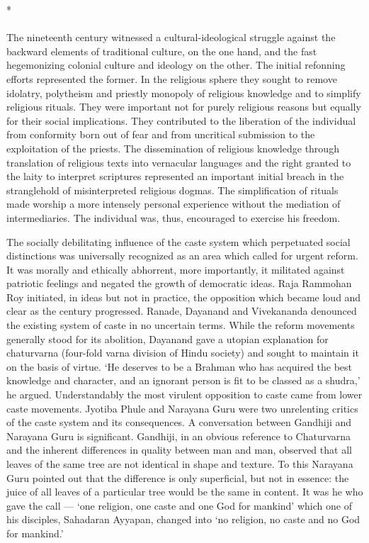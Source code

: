 \begin{center}*\end{center}

\paragraph*{}

The nineteenth century witnessed a cultural-ideological struggle against the backward elements of traditional culture, on the one hand, and the fast hegemonizing colonial culture and ideology on the other. The initial refonning efforts represented the former. In the religious sphere they sought to remove idolatry, polytheism and priestly monopoly of religious knowledge and to simplify religious rituals. They were important not for purely religious reasons but equally for their social implications. They contributed to the liberation of the individual from conformity born out of fear and from uncritical submission to the exploitation of the priests. The dissemination of religious knowledge through translation of religious texts into vernacular languages and the right granted to the laity to interpret scriptures represented an important initial breach in the stranglehold of misinterpreted religious dogmas. The simplification of rituals made worship a more intensely personal experience without the mediation of intermediaries. The individual was, thus, encouraged to exercise his freedom.

The socially debilitating influence of the caste system which perpetuated social distinctions was universally recognized as an area which called for urgent reform. It was morally and ethically abhorrent, more importantly, it militated against patriotic feelings and negated the growth of democratic ideas. Raja Rammohan Roy initiated, in ideas but not in practice, the opposition which became loud and clear as the century progressed. Ranade, Dayanand and Vivekananda denounced the existing system of caste in no uncertain terms. While the reform movements generally stood for its abolition, Dayanand gave a utopian explanation for chaturvarna (four-fold varna division of Hindu society) and sought to maintain it on the basis of virtue. `He deserves to be a Brahman who has acquired the best knowledge and character, and an ignorant person is fit to be classed as a shudra,' he argued. Understandably the most virulent opposition to caste came from lower caste movements. Jyotiba Phule and Narayana Guru were two unrelenting critics of the caste system and its consequences. A conversation between Gandhiji and Narayana Guru is significant. Gandhiji, in an obvious reference to Chaturvarna and the inherent differences in quality between man and man, observed that all leaves of the same tree are not identical in shape and texture. To this Narayana Guru pointed out that the difference is only superficial, but not in essence: the juice of all leaves of a particular tree would be the same in content. It was he who gave the call --- `one religion, one caste and one God for mankind' which one of his disciples, Sahadaran Ayyapan, changed into `no religion, no caste and no God for mankind.'

